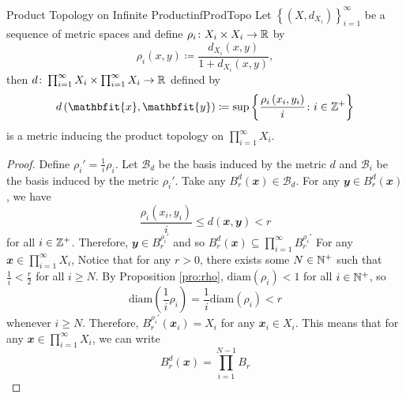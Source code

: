 \documentclass[math]{amznotes}
\theoremstyle{remark}
\begin{document}
\begin{probox}{Product Topology on Infinite Product}{infProdTopo}
    Let $\left\{\left(X, d_{X_i}\right)\right\}_{i = 1}^{\infty}$ be a sequence of metric spaces and define $\rho_i \colon X_i \times X_i \to \mathbb{R}$ by 
    \begin{equation*}
        \rho_i\left(x, y\right) \coloneqq \frac{d_{X_i}\left(x, y\right)}{1 + d_{X_i}\left(x, y\right)},
    \end{equation*}
    then $d \colon \prod_{i = 1}^{\infty}X_i \times \prod_{i = 1}^{\infty}X_i \to \mathbb{R}$ defined by 
    \begin{equation*}
        d\left(\mathbfit{x}, \mathbfit{y}\right) \coloneqq \sup \left\{\frac{\rho_{i}\left(x_i, y_i\right)}{i} \colon i \in \Z^+\right\}
    \end{equation*}
    is a metric inducing the product topology on $\prod_{i = 1}^{\infty}X_i$.
    \tcblower
    \begin{proof}
        Define $\rho_i' = \frac{1}{i}\rho_i$. Let $\mathcal{B}_d$ be the basis induced by the metric $d$ and $\mathcal{B}_i$ be the basis induced by the metric $\rho_i'$. Take any $B_r^d\left(\mathbfit{x}\right) \in \mathcal{B}_d$. For any $\mathbfit{y} \in B_r^d\left(\mathbfit{x}\right)$, we have 
        \begin{equation*}
            \frac{\rho_i\left(x_i, y_i\right)}{i} \leq d\left(\mathbfit{x}, \mathbfit{y}\right) < r
        \end{equation*}
        for all $i \in \mathbb{Z}^+$. Therefore, $\mathbfit{y} \in B_r^{\rho_i'}$ and so $B_r^d\left(\mathbfit{x}\right) \subseteq \prod_{i = 1}^{\infty}B_r^{\rho_i'}$
        For any $\mathbfit{x} \in \prod_{i = 1}^{\infty}X_i$, Notice that for any $r > 0$, there exists some $N \in \mathbb{N}^+$ such that $\frac{1}{i} < \frac{r}{2}$ for all $i \geq N$. By Proposition \ref{pro:rho}, $\mathrm{diam}\left(\rho_i\right) < 1$ for all $i \in \mathbb{N}^+$, so 
        \begin{equation*}
            \mathrm{diam}\left(\frac{1}{i}\rho_i\right) = \frac{1}{i}\mathrm{diam}\left(\rho_i\right) < r
        \end{equation*}
        whenever $i \geq N$.  Therefore, $B_r^{\rho_i'}\left(\mathbfit{x}_i\right) = X_i$ for any $\mathbfit{x}_i \in X_i$. This means that for any $\mathbfit{x} \in \prod_{i = 1}^{\infty}X_i$, we can write 
        \begin{equation*}
            B_r^d\left(\mathbfit{x}\right) = \prod_{i = 1}^{N - 1}B_r
        \end{equation*}
    \end{proof}
\end{probox}
\end{document}

